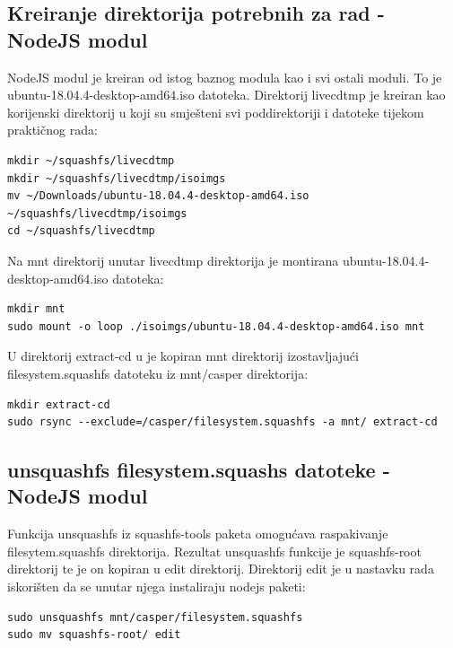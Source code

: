 \documentclass[12pt,vi]{mitthesis}
\begin{document}
\subsection*{Kreiranje direktorija potrebnih za rad - NodeJS modul}
\noindent
NodeJS modul je kreiran od istog baznog modula kao i svi ostali moduli. To je ubuntu-18.04.4-desktop-amd64.iso datoteka. Direktorij livecdtmp je kreiran kao korijenski direktorij u koji su smješteni svi poddirektoriji i datoteke tijekom praktičnog rada:
\begin{lstlisting}[style=BashInputStyle]
mkdir ~/squashfs/livecdtmp
mkdir ~/squashfs/livecdtmp/isoimgs
mv ~/Downloads/ubuntu-18.04.4-desktop-amd64.iso ~/squashfs/livecdtmp/isoimgs
cd ~/squashfs/livecdtmp
\end{lstlisting}

\noindent
Na mnt direktorij unutar livecdtmp direktorija je montirana ubuntu-18.04.4-desktop-amd64.iso datoteka:
\begin{lstlisting}[style=BashInputStyle]
mkdir mnt
sudo mount -o loop ./isoimgs/ubuntu-18.04.4-desktop-amd64.iso mnt
\end{lstlisting}

\noindent
U direktorij extract-cd u je kopiran mnt direktorij izostavljajući filesystem.squashfs datoteku iz mnt/casper direktorija:
\begin{lstlisting}[style=BashInputStyle]
mkdir extract-cd
sudo rsync --exclude=/casper/filesystem.squashfs -a mnt/ extract-cd
\end{lstlisting}

\subsection*{unsquashfs filesystem.squashs datoteke - NodeJS modul}
\indent
Funkcija unsquashfs iz squashfs-tools paketa omogućava raspakivanje filesytem.squashfs direktorija. Rezultat unsquashfs funkcije je squashfs-root direktorij te je on kopiran u edit direktorij. Direktorij edit je u nastavku rada iskorišten da se unutar njega instaliraju nodejs paketi:
\begin{lstlisting}[style=BashInputStyle]
sudo unsquashfs mnt/casper/filesystem.squashfs
sudo mv squashfs-root/ edit
\end{lstlisting}
\end{document}
